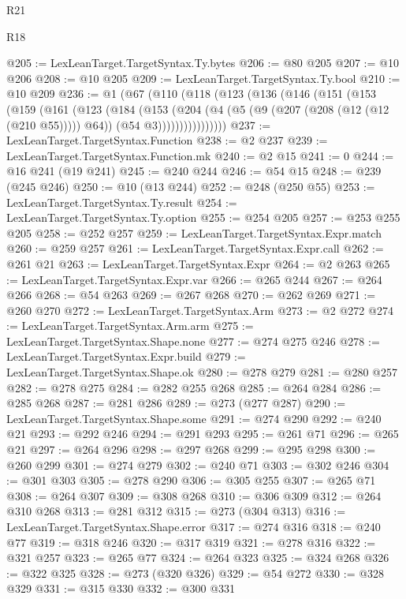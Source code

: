 \begin{lexlean}{R21}
\begin{lexlean}{R18}
\begin{coremodule}
{{{{{{{{{{{{{{{{{{{{{{{{{{{{{{{{{{{{{{{{{{{{{{{{{{{{{{{{{{{{{{{{{{{{{{{{{{{{{{{{{{{{{{{{{{{{{{{{{{{{{{{{{{{{{{{{{{{{{{{{{{{{@205 := LexLeanTarget.TargetSyntax.Ty.bytes
@206 := @80 @205
@207 := @10 @206
@208 := @10 @205
@209 := LexLeanTarget.TargetSyntax.Ty.bool
@210 := @10 @209
@236 := @1
    (@67
      (@110
        (@118
          (@123
            (@136
              (@146
                (@151
                  (@153
                    (@159
                      (@161
                        (@123
                          (@184
                            (@153
                              (@204
                                (@4
                                  (@5 (@9 (@207 (@208 (@12 (@12 (@210 @55))))) @64))
                                  (@54 @3))))))))))))))))
@237 := LexLeanTarget.TargetSyntax.Function
@238 := @2 @237
@239 := LexLeanTarget.TargetSyntax.Function.mk
@240 := @2 @15
@241 := 0
@244 := @16 @241 (@19 @241)
@245 := @240 @244
@246 := @54 @15
@248 := @239 (@245 @246)
@250 := @10 (@13 @244)
@252 := @248 (@250 @55)
@253 := LexLeanTarget.TargetSyntax.Ty.result
@254 := LexLeanTarget.TargetSyntax.Ty.option
@255 := @254 @205
@257 := @253 @255 @205
@258 := @252 @257
@259 := LexLeanTarget.TargetSyntax.Expr.match
@260 := @259 @257
@261 := LexLeanTarget.TargetSyntax.Expr.call
@262 := @261 @21
@263 := LexLeanTarget.TargetSyntax.Expr
@264 := @2 @263
@265 := LexLeanTarget.TargetSyntax.Expr.var
@266 := @265 @244
@267 := @264 @266
@268 := @54 @263
@269 := @267 @268
@270 := @262 @269
@271 := @260 @270
@272 := LexLeanTarget.TargetSyntax.Arm
@273 := @2 @272
@274 := LexLeanTarget.TargetSyntax.Arm.arm
@275 := LexLeanTarget.TargetSyntax.Shape.none
@277 := @274 @275 @246
@278 := LexLeanTarget.TargetSyntax.Expr.build
@279 := LexLeanTarget.TargetSyntax.Shape.ok
@280 := @278 @279
@281 := @280 @257
@282 := @278 @275
@284 := @282 @255 @268
@285 := @264 @284
@286 := @285 @268
@287 := @281 @286
@289 := @273 (@277 @287)
@290 := LexLeanTarget.TargetSyntax.Shape.some
@291 := @274 @290
@292 := @240 @21
@293 := @292 @246
@294 := @291 @293
@295 := @261 @71
@296 := @265 @21
@297 := @264 @296
@298 := @297 @268
@299 := @295 @298
@300 := @260 @299
@301 := @274 @279
@302 := @240 @71
@303 := @302 @246
@304 := @301 @303
@305 := @278 @290
@306 := @305 @255
@307 := @265 @71
@308 := @264 @307
@309 := @308 @268
@310 := @306 @309
@312 := @264 @310 @268
@313 := @281 @312
@315 := @273 (@304 @313)
@316 := LexLeanTarget.TargetSyntax.Shape.error
@317 := @274 @316
@318 := @240 @77
@319 := @318 @246
@320 := @317 @319
@321 := @278 @316
@322 := @321 @257
@323 := @265 @77
@324 := @264 @323
@325 := @324 @268
@326 := @322 @325
@328 := @273 (@320 @326)
@329 := @54 @272
@330 := @328 @329
@331 := @315 @330
@332 := @300 @331
}}}}}}}}}}}}}}}}}}}}}}}}}}}}}}}}}}}}}}}}}}}}}}}}}}}}}}}}}}}}}}}}}}}}}}}}}}}}}}}}}}}}}}}}}}}}}}}}}}}}}}}}}}}}}}}}}}}}}}}}}}}}
\end{coremodule}
\end{lexlean}
\end{lexlean}
